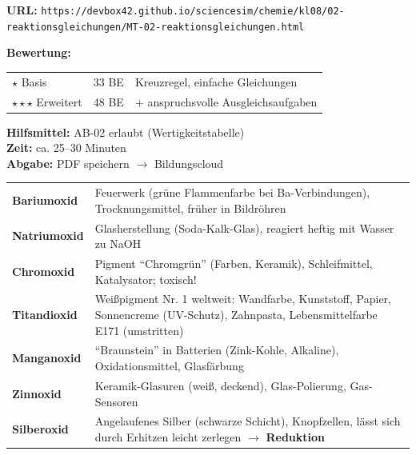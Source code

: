 \documentclass[11pt, a4paper]{article}
\newcommand{\abschnitt}[1]{%
    \vspace{10pt}%
    \noindent{\large\bfseries\textcolor{fachfarbe}{#1}}%
    \vspace{6pt}%
    \nopagebreak[4]%
}
\begin{document}

\abschnitt{Stundenleistung MT-02}

\begin{infobox}
\textbf{URL:} \texttt{https://devbox42.github.io/sciencesim/chemie/kl08/02-reaktionsgleichungen/MT-02-reaktionsgleichungen.html}

\vspace{0.3em}
\textbf{Bewertung:}
\begin{tabular}{lll}
$\star$ Basis & 33 BE & Kreuzregel, einfache Gleichungen \\
$\star\star\star$ Erweitert & 48 BE & + anspruchsvolle Ausgleichsaufgaben
\end{tabular}

\vspace{0.3em}
\textbf{Hilfsmittel:} AB-02 erlaubt (Wertigkeitstabelle)\\
\textbf{Zeit:} ca. 25--30 Minuten\\
\textbf{Abgabe:} PDF speichern $\rightarrow$ Bildungscloud
\end{infobox}


\abschnitt{Hintergrundwissen: Die exotischen Oxide}

\small
\begin{tabular}{L{2.5cm}L{11.5cm}}
\textbf{Bariumoxid} & Feuerwerk (grüne Flammenfarbe bei Ba-Verbindungen), Trocknungsmittel, früher in Bildröhren \\[0.3em]
\textbf{Natriumoxid} & Glasherstellung (Soda-Kalk-Glas), reagiert heftig mit Wasser zu NaOH \\[0.3em]
\textbf{Chromoxid} & Pigment ``Chromgrün'' (Farben, Keramik), Schleifmittel, Katalysator; toxisch! \\[0.3em]
\textbf{Titandioxid} & Weißpigment Nr. 1 weltweit: Wandfarbe, Kunststoff, Papier, Sonnencreme (UV-Schutz), Zahnpasta, Lebensmittelfarbe E171 (umstritten) \\[0.3em]
\textbf{Manganoxid} & ``Braunstein'' in Batterien (Zink-Kohle, Alkaline), Oxidationsmittel, Glasfärbung \\[0.3em]
\textbf{Zinnoxid} & Keramik-Glasuren (weiß, deckend), Glas-Polierung, Gas-Sensoren \\[0.3em]
\textbf{Silberoxid} & Angelaufenes Silber (schwarze Schicht), Knopfzellen, lässt sich durch Erhitzen leicht zerlegen $\rightarrow$ \textbf{Reduktion} \\
\end{tabular}
\end{document}
